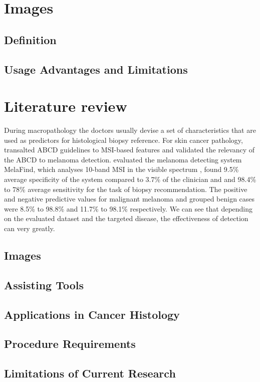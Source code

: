 \section{Images}
\subsection{Definition}
\par \blindtext

\subsection{Usage Advantages and Limitations}
\par \blindtext

\section{Literature review}

\par During macropathology the doctors usually devise a set of characteristics that are used as predictors for histological biopsy reference. For skin cancer pathology, \citeauthor{ac} \cite{ac} transalted  ABCD guidelines to MSI-based features and validated the relevancy of the ABCD to melanoma detection.  \citeauthor{aa} \cite{aa} evaluated the melanoma detecting system MelaFind, which analyses 10-band MSI in the visible spectrum \cite{ab}, found 9.5\% average specificity of the system compared to 3.7\% of the clinician and and 98.4\% to 78\%  average sensitivity for the task of biopsy recommendation. The positive and negative predictive values for malignant melanoma and grouped benign cases were 8.5\% to 98.8\%  and 11.7\% to 98.1\% respectively. We can see that depending on the evaluated dataset and the targeted disease, the effectiveness of detection can very greatly. 

\subsection{Images}
\par \blindtext



\subsection{Assisting Tools}
\par \blindtext  


 
\subsection{Applications in Cancer Histology} 
\par \blindtext  


\subsection{Procedure Requirements}
\par  \blindtext  
 

\subsection{Limitations of Current Research}
\par \blindtext  
